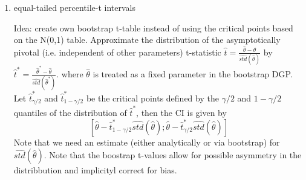 \documentclass[a4paper]{scrartcl}
\newif\ifpartDSGE  \partDSGEtrue
\begin{document}
\begin{enumerate}
\begin{enumerate}
\begin{solution}
		\end{solution}
		\item equal-tailed percentile-t intervals
		\begin{solution}
			Idea: create own bootstrap t-table instead of using the critical points based on the N(0,1) table. Approximate the distribution of the asymptotically pivotal (i.e. independent of other parameters) t-statistic $\hat{t}=\frac{\hat{\theta}-\theta}{\widehat{std}(\hat{\theta})}$ by $\hat{t}^\ast = \frac{\hat{\theta}^\ast-\hat{\theta}}{\widehat{std}(\hat{\theta}^\ast)}$. where $\hat{\theta}$ is treated as a fixed parameter in the bootstrap DGP. Let $\hat{t}^\ast_{\gamma/2}$ and $\hat{t}^\ast_{1-\gamma/2}$ be the critical points defined by the $\gamma/2$ and $1-\gamma/2$ quantiles of the distribution of $\hat{t}^\ast$, then the CI is given by
			$$[\hat{\theta}-\hat{t}^\ast_{1-\gamma/2} \widehat{std}(\hat{\theta}); \hat{\theta}-\hat{t}^\ast_{\gamma/2} \widehat{std}(\hat{\theta})]$$ Note that we need an estimate (either analytically or via bootstrap) for $\widehat{std}(\hat{\theta})$. Note that the boostrap t-values allow for possible asymmetry in the distribbution and implicityl correct for bias.
		\end{solution}
	\end{enumerate}
\end{enumerate}
\newpage
\fi

\ifpartDSGE
\end{document}
